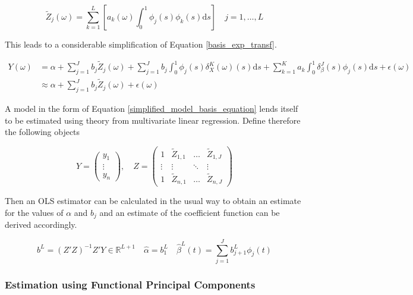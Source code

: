 \documentclass[11pt,twoside,a4paper]{article}
\begin{document}
	\begin{equation}
			\tilde{Z}_j(\omega) = \sum_{k = 1}^{L} \left[a_k(\omega) \int_{0}^{1} \phi_j(s) \phi_k(s) \mathrm{d}s \right] \quad j = 1, \dots, L
	\end{equation}

	This leads to a considerable simplification of Equation \ref{basis_exp_transf}.
	
	\begin{equation}\label{simplified_model_basis_equation}
		\begin{split}
			Y(\omega) &= \alpha + \sum_{j = 1}^{J} b_j \tilde{Z}_j(\omega) + \sum_{j = 1}^{J} b_j  \int_{0}^{1} \phi_j(s) \delta_{X}^{K}(\omega)(s) \mathrm{d}s + \sum_{k = 1}^{K} a_k  \int_{0}^{1} \delta_{\beta}^{J}(s)\phi_j(s) \mathrm{d}s + \epsilon(\omega) \\
			& \approx \alpha + \sum_{j = 1}^{J} b_j \tilde{Z}_j(\omega) + \epsilon(\omega)
		\end{split}
	\end{equation}

		A model in the form of Equation \ref{simplified_model_basis_equation} lends itself to be estimated using theory from multivariate linear regression. Define therefore the following objects
	
	\begin{equation}
		Y = \begin{pmatrix}
			y_1 \\ \vdots \\ y_n
		\end{pmatrix}, \quad
		Z = \begin{pmatrix}
			1 & \tilde{Z}_{1,1} & \dots & \tilde{Z}_{1,J} \\
			\vdots & \vdots & \ddots & \vdots \\
			1 & \tilde{Z}_{n,1} & \dots & \tilde{Z}_{n,J}
		\end{pmatrix}
	\end{equation}
	
	Then an OLS estimator can be calculated in the usual way to obtain an estimate for the values of $\alpha$ and $b_j$ and an estimate of the coefficient function can be derived accordingly.
	
	\begin{equation}
		b^L = \left(Z'Z\right)^{-1}Z'Y \in \mathbb{R}^{L+1} \quad \hat{\alpha} = b_{1}^{L} \quad \hat{\beta}^L(t) = \sum_{j = 1}^{J} b_{j+1}^L \phi_j(t)
	\end{equation}
	
	\subsubsection{Estimation using Functional Principal Components}
	
\end{document}
